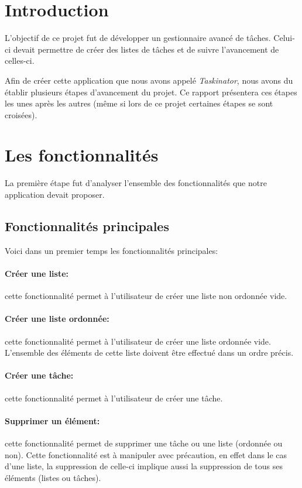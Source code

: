 \documentclass[a4paper,10pt]{article}
\begin{document}
\section{Introduction}
L'objectif de ce projet fut de développer un gestionnaire avancé de tâches. Celui-ci devait permettre de créer des listes de tâches et de suivre l'avancement de celles-ci.

Afin de créer cette application que nous avons appelé \textit{Taskinator}, nous avons du établir plusieurs étapes d'avancement du projet. Ce rapport présentera ces étapes les unes après les autres (même si lors de ce projet certaines étapes se sont croisées).

\newpage
\section{Les fonctionnalités}
La première étape fut d'analyser l'ensemble des fonctionnalités que notre application devait proposer. 

\subsection{Fonctionnalités principales}
Voici dans un premier temps les fonctionnalités principales:
\paragraph{Créer une liste:} cette fonctionnalité permet à l'utilisateur de créer une liste non ordonnée vide.
\paragraph{Créer une liste ordonnée:} cette fonctionnalité permet à l'utilisateur de créer une liste ordonnée vide. L'ensemble des éléments de cette liste doivent être effectué dans un ordre précis.
\paragraph{Créer une tâche:} cette fonctionnalité permet à l'utilisateur de créer une tâche.
\paragraph{Supprimer un élément:} cette fonctionnalité permet de supprimer une tâche ou une liste (ordonnée ou non). Cette fonctionnalité est à manipuler avec précaution, en effet dans le cas d'une liste, la suppression de celle-ci implique aussi la suppression de tous ses éléments (listes ou tâches).
\end{document}
